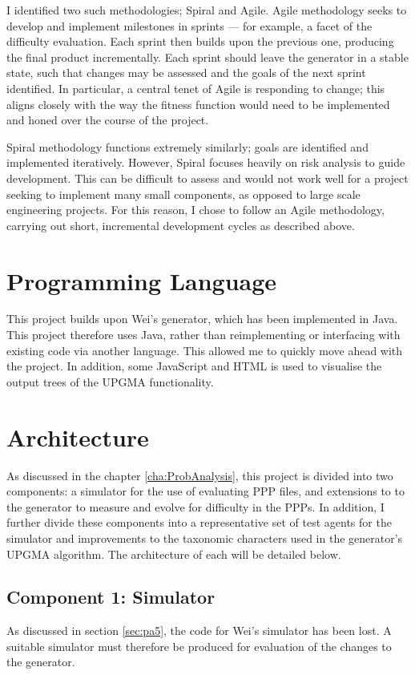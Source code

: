 \documentclass[authoryearcitations]{UoYCSproject}
\begin{document}
I identified two such methodologies; Spiral and Agile. Agile methodology \cite{agile} seeks to develop and implement milestones in sprints --- for example, a facet of the difficulty evaluation. Each sprint then builds upon the previous one, producing the final product incrementally. Each sprint should leave the generator in a stable state, such that changes may be assessed and the goals of the next sprint identified. In particular, a central tenet of Agile is responding to change; this aligns closely with the way the fitness function would need to be implemented and honed over the course of the project.

Spiral methodology \cite{spiral} functions extremely similarly; goals are identified and implemented iteratively. However, Spiral focuses heavily on risk analysis to guide development. This can be difficult to assess and would not work well for a project seeking to implement many small components, as opposed to large scale engineering projects. For this reason, I chose to follow an Agile methodology, carrying out short, incremental development cycles as described above.


\section{Programming Language}
\label{sec:da_2}

This project builds upon Wei's generator, which has been implemented in Java. This project therefore uses Java, rather than reimplementing or interfacing with existing code via another language. This allowed me to quickly move ahead with the project. In addition, some JavaScript and HTML is used to visualise the output trees of the UPGMA functionality.

\section{Architecture}
\label{sec:da_3}

As discussed in the chapter \ref{cha:ProbAnalysis}, this project is divided into two components: a simulator for the use of evaluating PPP files, and extensions to to the generator to measure and evolve for difficulty in the PPPs. In addition, I further divide these components into a representative set of test agents for the simulator and improvements to the taxonomic characters used in the generator's UPGMA algorithm. The architecture of each will be detailed below.

\subsection{Component 1: Simulator}
\label{sec:da_3_1}
As discussed in section \ref{sec:pa5}, the code for Wei's simulator has been lost. A suitable simulator must therefore be produced for evaluation of the changes to the generator.
\end{document}
